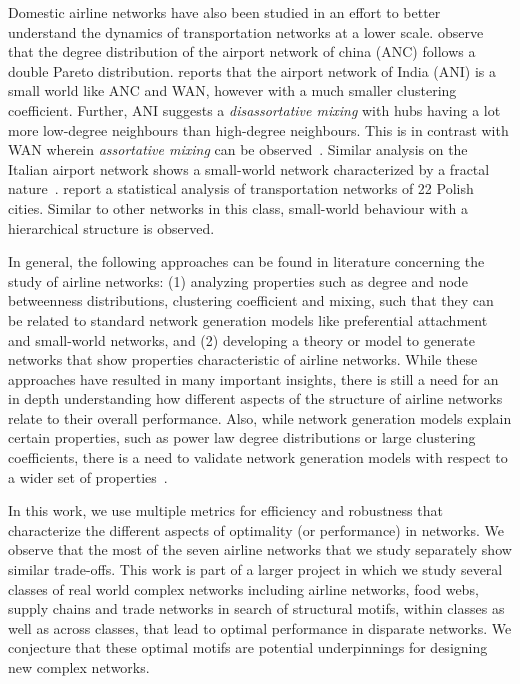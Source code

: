 \documentclass[10pt]{article}
\begin{document}
Domestic airline networks have also been studied in an effort to better understand the dynamics of transportation networks at a lower scale. %
\cite{li04} observe that the degree distribution of the airport network of china (ANC) follows a double Pareto distribution. %
\cite{bagler08} reports that the airport network of India (ANI) is a small world like ANC and WAN, however with a much smaller clustering coefficient. Further, ANI suggests a \textit{disassortative mixing} with hubs having a lot more low-degree neighbours than high-degree neighbours. This is in contrast with WAN wherein \textit{assortative mixing} can be observed~\citep{barrat04}. Similar analysis on the Italian airport network shows a small-world network characterized by a fractal nature~\citep{guida07}. %
\cite{sienkiewicz05} report a statistical analysis of transportation networks of 22 Polish cities. Similar to other networks in this class, small-world behaviour with a hierarchical structure is observed.

In general, the following approaches can be found in literature concerning the study of airline networks: (1) analyzing properties such as degree and node betweenness distributions, clustering coefficient and mixing, such that they can be related to standard network generation models like preferential attachment and small-world networks, and (2) developing a theory or model to generate networks that show properties characteristic of airline networks.
While these approaches have resulted in many important insights, there is still a need for an in depth understanding how different aspects of the structure of airline networks relate to their overall performance. Also, while network generation models explain certain properties, such as power law degree distributions or large clustering coefficients, there is a need to validate network generation models with respect to a wider set of properties~\citep{mitzenmacher04}.

In this work, %
we use multiple metrics for efficiency and robustness that characterize the different aspects of optimality (or performance) in networks. We observe that the most of the seven airline networks that we study separately show similar trade-offs. %
This work is part of a larger project in which we study several classes of real world complex networks including airline networks, food webs, supply chains and trade networks in search of structural motifs, within classes as well as across classes, that lead to optimal performance in disparate networks. We conjecture that these optimal motifs are potential underpinnings for designing new complex networks.
\end{document}
